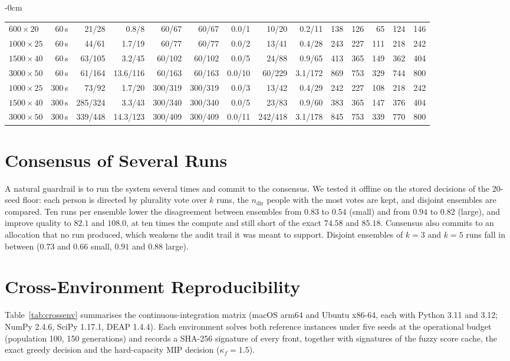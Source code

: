 \documentclass[systems,article,accept,moreauthors,pdftex]{Definitions/mdpi}
\begin{document}
\begin{table}[H]
\begin{adjustwidth}{-\extralength}{0cm}
\begin{minipage}{\fulllength}
\begin{tabularx}{\textwidth}{LRrRRRRRR|rrRRR}
$600\times20$ & 60\,s & 21/28 & 0.8/8 & 60/67 & 60/67 & 0.0/1 & 10/20 & 0.2/11 & 138 & 126 & 65 & 124 & 146\\
$1000\times25$ & 60\,s & 44/61 & 1.7/19 & 60/77 & 60/77 & 0.0/2 & 13/41 & 0.4/28 & 243 & 227 & 111 & 218 & 242\\
$1500\times40$ & 60\,s & 63/105 & 3.2/45 & 60/102 & 60/102 & 0.0/5 & 24/88 & 0.9/65 & 413 & 365 & 149 & 362 & 404\\
$3000\times50$ & 60\,s & 61/164 & 13.6/116 & 60/163 & 60/163 & 0.0/10 & 60/229 & 3.1/172 & 869 & 753 & 329 & 744 & 800\\
\midrule
$1000\times25$ & 300\,s & 73/92 & 1.7/20 & 300/319 & 300/319 & 0.0/3 & 13/42 & 0.4/29 & 242 & 227 & 108 & 218 & 242\\
$1500\times40$ & 300\,s & 285/324 & 3.3/43 & 300/340 & 300/340 & 0.0/5 & 23/83 & 0.9/60 & 383 & 365 & 147 & 376 & 404\\
$3000\times50$ & 300\,s & 339/448 & 14.3/123 & 300/409 & 300/409 & 0.0/11 & 242/418 & 3.1/178 & 845 & 753 & 339 & 770 & 800\\
\bottomrule
\end{tabularx}
\end{minipage}
\end{adjustwidth}
\end{table}

\section{Consensus of Several Runs}\label{app:consensus}
A natural guardrail is to run the system several times and commit to the consensus. We
tested it offline on the stored decisions of the 20-seed floor: each person is directed by plurality vote over $k$ runs,
the $n_{\mathrm{dir}}$ people with the most votes are kept, and disjoint ensembles are
compared. Ten runs per ensemble lower the disagreement between ensembles from $0.83$ to $0.54$
(small) and from $0.94$ to $0.82$ (large), and improve quality to $82.1$ and $108.0$, at ten
times the compute and still short of the exact $74.58$ and $85.18$. Consensus also commits
to an allocation that no run produced, which weakens the audit trail it was meant to support. Disjoint ensembles of $k=3$ and $k=5$ runs fall in between
($0.73$ and $0.66$ small, $0.91$ and $0.88$ large).

\section{Cross-Environment Reproducibility}\label{app:crossenv}
Table~\ref{tab:crossenv} summarises the continuous-integration matrix (macOS arm64 and Ubuntu
x86-64, each with Python 3.11 and 3.12; NumPy 2.4.6, SciPy 1.17.1, DEAP 1.4.4). Each
environment solves both reference instances under five seeds at the operational budget
(population 100, 150 generations) and records a SHA-256 signature of every front, together
with signatures of the fuzzy score cache, the exact greedy decision and the hard-capacity MIP
decision ($\kappa_f = 1.5$).
\end{document}
